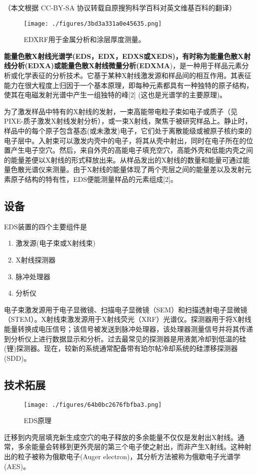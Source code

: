 
（本文根据 CC-BY-SA 协议转载自原搜狗科学百科对英文维基百科的翻译）
\begin{figure}[ht]
\centering
\texttt{[image: ./figures/3bd3a331a0e45635.png]}
\caption{EDXRF用于金属分析和涂层厚度测量。} \label{fig_Xgpx_2}
\end{figure}
\textbf{能量色散X射线光谱学(EDS，EDX，EDXS或XEDS)，有时称为能量色散X射线分析(EDXA)或能量色散X射线微量分析(EDXMA})，是一种用于样品元素分析或化学表征的分析技术。它基于某种X射线激发源和样品间的相互作用。其表征能力在很大程度上归因于一个基本原理，即每种元素都具有一种独特的原子结构，使其在电磁发射光谱中产生一组独特的峰[2] (这也是光谱学的主要原理)。

为了激发样品中特有的X射线的发射，一束高能带电粒子束如电子或质子（见PIXE-质子激发X射线发射分析），或一束X射线，聚焦于被研究样品上。静止时，样品中的每个原子包含基态(或未激发)电子，它们处于离散能级或被原子核约束的电子层中。入射束可以激发内壳中的电子，将其从壳中射出，同时在电子所在的位置产生电子空穴。然后，来自外壳的高能电子填充空穴，高能外壳和低能内壳之间的能量差便以X射线的形式释放出来。从样品发出的X射线的数量和能量可通过能量色散光谱仪来测量。由于X射线的能量体现了两个壳层之间的能量差以及发射元素原子结构的特有性，EDS便能测量样品的元素组成[2]。

\subsection{设备}
EDS装置的四个主要组件是
\begin{enumerate}
\item 激发源(电子束或X射线束)
\item X射线探测器
\item 脉冲处理器
\item 分析仪
\end{enumerate}
电子束激发源用于电子显微镜、扫描电子显微镜（SEM）和扫描透射电子显微镜（STEM）。X射线束激发源用于X射线荧光（XRF）光谱仪。探测器用于将X射线能量转换成电压信号；该信号被发送到脉冲处理器，该处理器测量信号并将其传递到分析仪上进行数据显示和分析。过去最常见的探测器是用液氮冷却到低温的硅(锂)探测器。现在，较新的系统通常配备带有珀尔帖冷却系统的硅漂移探测器(SDD)。

\subsection{技术拓展}
\begin{figure}[ht]
\centering
\texttt{[image: ./figures/64b0bc2676fbfba3.png]}
\caption{EDS原理} \label{fig_Xgpx_1}
\end{figure}
迁移到内壳层填充新生成空穴的电子释放的多余能量不仅仅是发射出X射线。通常，多余能量会转移到更外壳层的第三个电子使之射出，而非产生X射线。这种射出的粒子被称为俄歇电子(Auger electron)，其分析方法被称为俄歇电子光谱学(AES)。


